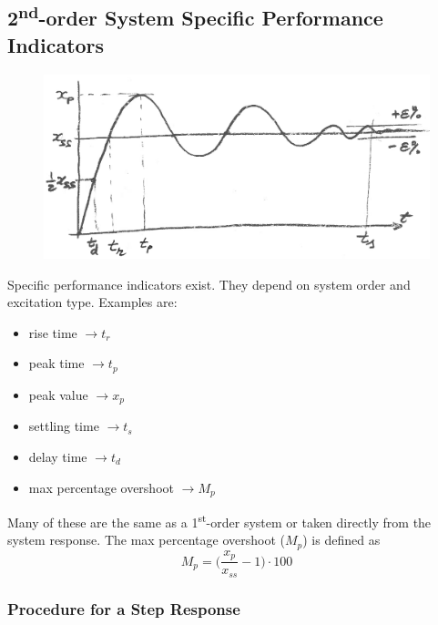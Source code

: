 \documentclass[12pt,letter]{article}
\begin{document}
\subsection{2\textsuperscript{nd}-order System Specific Performance Indicators}

\begin{figure}[H]
	\centering
	\includegraphics[width=5.5in]{../figures/2nd_order_system_specific_performance_indicators}
\end{figure}

Specific performance indicators exist. They depend on system order and excitation type. Examples are: 
\begin{itemize}
	\item rise time $ \rightarrow t_r$
	\item peak time  $ \rightarrow t_p$
	\item peak value  $ \rightarrow x_p$
	\item settling time $ \rightarrow t_s$
	\item delay time  $ \rightarrow t_d$
	\item max percentage overshoot $ \rightarrow M_p$
\end{itemize}
Many of these are the same as a 1\textsuperscript{st}-order system or taken directly from the system response. The max percentage overshoot ($M_p$) is defined as 
\begin{equation}
M_p = \bigg( \frac{x_p}{x_{ss}}-1 \bigg) \cdot 100
\end{equation}

\subsubsection{Procedure for a Step Response}
\end{document}
